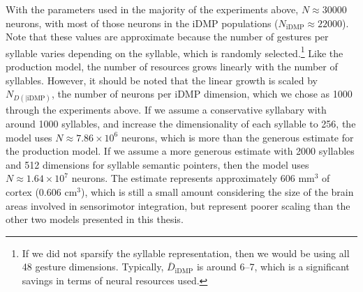 With the parameters used
in the majority of the experiments above,
$N\approx 30000$ neurons,
with most of those neurons
in the iDMP populations
($N_{\text{iDMP}}\approx 22000$).
Note that these values are approximate
because the number of gestures per syllable
varies depending on the syllable,
which is randomly selected.\footnote{
  If we did not sparsify the syllable representation,
  then we would be using all 48 gesture dimensions.
  Typically, $\overline{D}_{\text{iDMP}}$ is around 6--7,
  which is a significant savings in terms
  of neural resources used.}
Like the production model,
the number of resources
grows linearly with the number of syllables.
However, it should be noted that the
linear growth is scaled by
$N_{D(|\text{iDMP})}$,
the number of neurons per iDMP dimension,
which we chose as 1000 through the experiments above.
If we assume a conservative syllabary
with around 1000 syllables,
and increase the dimensionality
of each syllable to 256,
the model uses
$N \approx 7.86 \times 10^6$ neurons,
which is more than the generous
estimate for the production model.
If we assume a more generous estimate
with 2000 syllables
and 512 dimensions
for syllable semantic pointers,
then the model uses
$N \approx 1.64 \times 10^7$ neurons.
The estimate represents approximately
606 mm$^3$ of cortex (0.606 cm$^3$),
which is still a small amount
considering the size of the brain areas
involved in sensorimotor integration,
but represent poorer scaling
than the other two models presented in this thesis.
